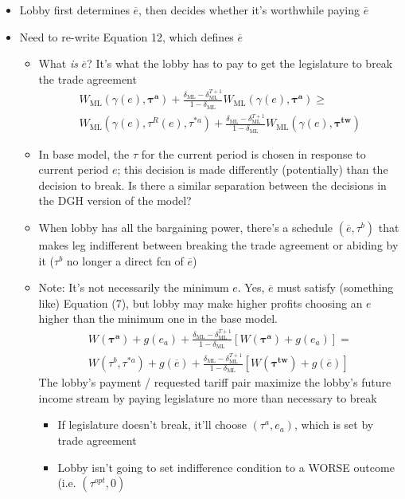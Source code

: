 \documentclass[12pt]{article}
\newcommand{\ov}{\overline}
\newcommand{\bta}{\bm{\tau^a}}
\newcommand{\btw}{\bm{\tau^{tw}}}
\newcommand{\ga}{\gamma}
\newcommand{\de}{\delta}
\begin{document}
\begin{itemize}
				\begin{itemize}
					\item Lobby first determines $\ov{e}$, then decides whether it's worthwhile paying $\ov{e}$
					\item Need to re-write Equation 12, which defines $\ov{e}$
						\begin{itemize}	
							\item What \textit{is} $\ov{e}$? It's what the lobby has to pay to get the legislature to break the trade agreement
							\begin{multline}
						W_{\text{ML}}(\ga(e),\bta) + \frac{\de_\text{ML} - \de_\text{ML}^{T+1}}{1-\de_\text{ML}} W_\text{ML}(\ga(e),\bta)  \geq \\
	W_{\text{ML}}(\ga(e),\tau^R(e),\tau^{*a}) + \frac{\de_\text{ML} - \de_\text{ML}^{T+1}}{1-\de_\text{ML}} W_{\text{ML}}(\ga(e),\btw)
  \label{ine:leg2}
					\end{multline}
						\item In base model, the $\tau$ for the current period is chosen in response to current period $e$; this decision is made differently (potentially) than the decision to break. Is there a similar separation between the decisions in the DGH version of the model?
						\item When lobby has all the bargaining power, there's a schedule $(\ov{e},\tau^b)$ that makes leg indifferent between breaking the trade agreement or abiding by it ($\tau^b$ no longer a direct fcn of $\ov{e}$)
						\item Note: It's not necessarily the minimum $e$. Yes, $\ov{e}$ must satisfy (something like) Equation (7), but lobby may make higher profits choosing an $e$ higher than the minimum one in the base model.
							\begin{multline}
								W(\bta) + g(e_a) + \frac{\de_\text{ML} - \de_\text{ML}^{T+1}}{1-\de_\text{ML}}\left[W(\bta) + g(e_a)\right] = \\
	W(\tau^b,\tau^{*a}) +g(\ov{e}) + \frac{\de_\text{ML} - \de_\text{ML}^{T+1}}{1-\de_\text{ML}} \left[W(\btw) + g(\ov{e})\right]
								\label{eq:newleg}
							\end{multline}
							The lobby's payment / requested tariff pair maximize the lobby's future income stream by paying legislature no more than necessary to break
								\begin{itemize}
									\item If legislature doesn't break, it'll choose $\left(\tau^a,e_a\right)$, which is set by trade agreement
									\item Lobby isn't going to set indifference condition to a WORSE outcome (i.e. $\left(\tau^{opt},0\right)$

\end{itemize}
\end{itemize}
\end{itemize}
\end{itemize}
\end{document}
